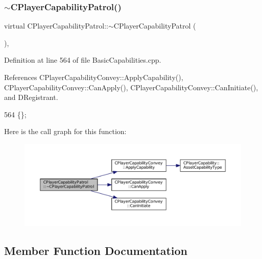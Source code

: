 \subsubsection{\texorpdfstring{$\sim$\+C\+Player\+Capability\+Patrol()}{~CPlayerCapabilityPatrol()}}
{\footnotesize\ttfamily virtual C\+Player\+Capability\+Patrol\+::$\sim$\+C\+Player\+Capability\+Patrol (\begin{DoxyParamCaption}{ }\end{DoxyParamCaption})\hspace{0.3cm}{\ttfamily [inline]}, {\ttfamily [virtual]}}



Definition at line 564 of file Basic\+Capabilities.\+cpp.



References C\+Player\+Capability\+Convey\+::\+Apply\+Capability(), C\+Player\+Capability\+Convey\+::\+Can\+Apply(), C\+Player\+Capability\+Convey\+::\+Can\+Initiate(), and D\+Registrant.


\begin{DoxyCode}
564 \{\};
\end{DoxyCode}
Here is the call graph for this function\+:\nopagebreak
\begin{figure}[H]
\begin{center}
\leavevmode
\includegraphics[width=350pt]{classCPlayerCapabilityPatrol_a1f27cf43aabf3360d5db92fd23b55c01_cgraph}
\end{center}
\end{figure}


\subsection{Member Function Documentation}
\hypertarget{classCPlayerCapabilityPatrol_a6b9e361d99e256efadcd99a829f93f51}{}\label{classCPlayerCapabilityPatrol_a6b9e361d99e256efadcd99a829f93f51} 
